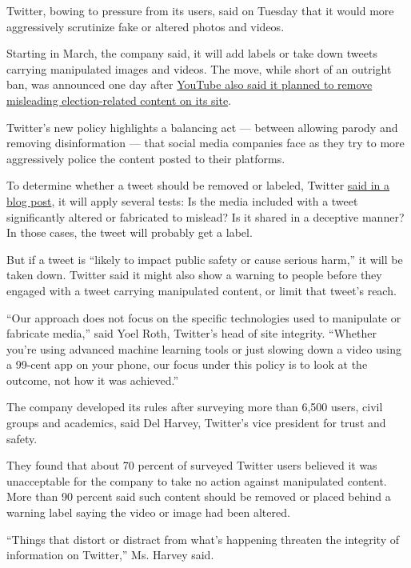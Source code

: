 Twitter, bowing to pressure from its users, said on Tuesday that it
would more aggressively scrutinize fake or altered photos and videos.

Starting in March, the company said, it will add labels or take down
tweets carrying manipulated images and videos. The move, while short of
an outright ban, was announced one day after
\href{https://www.nytimes.com/2020/02/03/technology/youtube-misinformation-election.html}{YouTube
also said it planned to remove misleading election-related content on
its site}.

Twitter's new policy highlights a balancing act --- between allowing
parody and removing disinformation --- that social media companies face
as they try to more aggressively police the content posted to their
platforms.

To determine whether a tweet should be removed or labeled, Twitter
\href{https://blog.twitter.com/en_us/topics/company/2020/new-approach-to-synthetic-and-manipulated-media.html}{said
in a blog post}, it will apply several tests: Is the media included with
a tweet significantly altered or fabricated to mislead? Is it shared in
a deceptive manner? In those cases, the tweet will probably get a label.

But if a tweet is ``likely to impact public safety or cause serious
harm,'' it will be taken down. Twitter said it might also show a warning
to people before they engaged with a tweet carrying manipulated content,
or limit that tweet's reach.

``Our approach does not focus on the specific technologies used to
manipulate or fabricate media,'' said Yoel Roth, Twitter's head of site
integrity. ``Whether you're using advanced machine learning tools or
just slowing down a video using a 99-cent app on your phone, our focus
under this policy is to look at the outcome, not how it was achieved.''

The company developed its rules after surveying more than 6,500 users,
civil groups and academics, said Del Harvey, Twitter's vice president
for trust and safety.

They found that about 70 percent of surveyed Twitter users believed it
was unacceptable for the company to take no action against manipulated
content. More than 90 percent said such content should be removed or
placed behind a warning label saying the video or image had been
altered.

``Things that distort or distract from what's happening threaten the
integrity of information on Twitter,'' Ms. Harvey said.


